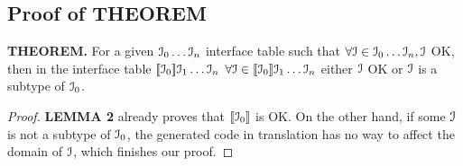 \subsection{Proof of THEOREM}\label{subsec:proof3}
\textbf{THEOREM. }
For a given ${\cal{I}}_0\ldots{\cal{I}}_n$ interface table such that
$\forall{\cal{I}}\in{\cal{I}}_0\ldots{\cal{I}}_n, {\cal{I}}$ OK, then in the interface table
$[\![{\cal{I}}_0]\!]{\cal{I}}_1\ldots{\cal{I}}_n$
$\forall{\cal{I}}\in[\![{\cal{I}}_0]\!]{\cal{I}}_1\ldots{\cal{I}}_n$ either ${\cal{I}}$ OK or ${\cal{I}}$ is a subtype of ${\cal{I}}_0$.
\begin{proof}
\textbf{LEMMA 2} already proves that $[\![{\cal{I}}_0]\!]$ is OK. On the other hand, if some ${\cal{I}}$ is not a subtype of ${\cal{I}}_0$, the generated code in translation has no way to affect the domain of ${\cal{I}}$, which finishes our proof.
\end{proof}
